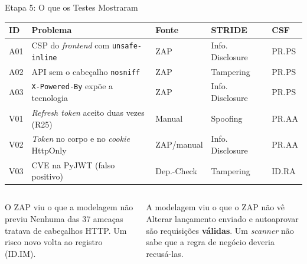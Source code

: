 \documentclass{beamer}
\begin{document}
\begin{frame}{Etapa 5: O que os Testes Mostraram}
    \scriptsize
    \renewcommand{\arraystretch}{1.15}
    \setlength{\tabcolsep}{4pt}
    \begin{tabular}{@{}l p{4.6cm} l l l@{}}
        \toprule
        \textbf{ID} & \textbf{Problema} & \textbf{Fonte} & \textbf{STRIDE} & \textbf{CSF} \\
        \midrule
        A01 & CSP do \textit{frontend} com \texttt{unsafe-inline} & ZAP & Info. Disclosure & PR.PS \\
        A02 & API sem o cabeçalho \texttt{nosniff} & ZAP & Tampering & PR.PS \\
        A03 & \texttt{X-Powered-By} expõe a tecnologia & ZAP & Info. Disclosure & PR.PS \\
        V01 & \textit{Refresh token} aceito duas vezes (R25) & Manual & Spoofing & PR.AA \\
        V02 & \textit{Token} no corpo e no \textit{cookie} HttpOnly & ZAP/manual & Info. Disclosure & PR.AA \\
        V03 & CVE na PyJWT (falso positivo) & Dep.-Check & Tampering & ID.RA \\
        \bottomrule
    \end{tabular}

    \vspace{0.25cm}
    \begin{columns}[T]
        \begin{exampleblock}{O ZAP viu o que a modelagem não previu}
            \scriptsize
            Nenhuma das 37 ameaças tratava de cabeçalhos HTTP. Um risco novo volta ao registro (ID.IM).
        \end{exampleblock}
        \begin{alertblock}{A modelagem viu o que o ZAP não vê}
            \scriptsize
            Alterar lançamento enviado e autoaprovar são requisições \textbf{válidas}. Um \textit{scanner} não sabe que a regra de negócio deveria recusá-las.
        \end{alertblock}
    \end{columns}
\end{frame}
\end{document}
